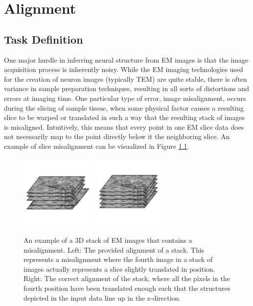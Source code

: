 \chapter{Alignment}

\section{Task Definition}


One major hurdle in inferring neural structure from EM images is that the image acquisition process is inherently noisy. While the EM imaging technologies used for the creation of neuron images (typically TEM) are quite stable, there is often variance in sample preparation techniques, resulting in all sorts of distortions and errors at imaging time. One particular type of error, image misalignment, occurs during the slicing of sample tissue, when some physical factor causes a resulting slice to be warped or translated in such a way that the resulting stack of images is misaligned. Intuitively, this means that every point in one EM slice data does not necessarily map to the point directly below it the neighboring slice. An example of slice misalignment can be visualized in Figure \ref{fig:misalignment_example}.

\begin{figure}[h]
    \centering
	\includegraphics[width=0.33\textwidth]{img/misalignment_example}
	\hspace{1cm}
	\includegraphics[width=0.33\textwidth]{img/alignment_example}
    \caption[An example of a 3D stack of EM images that contains a misalignment]{An example of a 3D stack of EM images that contains a misalignment. Left: The provided alignment of a stack. This represents a misalignment where the fourth image in a stack of images actually represents a slice slightly translated in position. Right: The correct alignment of the stack, where all the pixels in the fourth position have been translated enough such that the structures depicted in the input data line up in the z-direction.}
    \label{fig:misalignment_example}
\end{figure}


